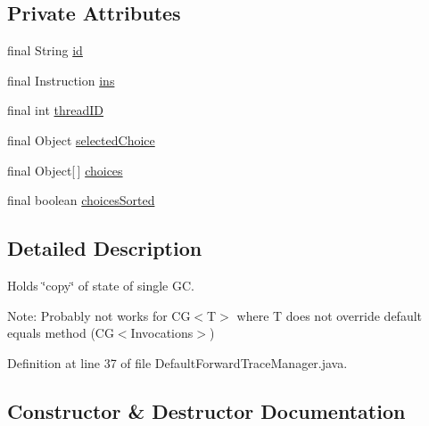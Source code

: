 \subsection*{Private Attributes}
\begin{DoxyCompactItemize}
\item 
final String \hyperlink{classgov_1_1nasa_1_1jpf_1_1inspector_1_1server_1_1breakpoints_1_1_default_forward_trace_manager_1_1_c_g_state_memento_a647b61390c0a8805961939e1ed75a6e1}{id}
\item 
final Instruction \hyperlink{classgov_1_1nasa_1_1jpf_1_1inspector_1_1server_1_1breakpoints_1_1_default_forward_trace_manager_1_1_c_g_state_memento_a84673ec3abdd6b60e5636108fe6090ba}{ins}
\item 
final int \hyperlink{classgov_1_1nasa_1_1jpf_1_1inspector_1_1server_1_1breakpoints_1_1_default_forward_trace_manager_1_1_c_g_state_memento_a0df8f1d8e048a64e584737e11d506eb3}{thread\+ID}
\item 
final Object \hyperlink{classgov_1_1nasa_1_1jpf_1_1inspector_1_1server_1_1breakpoints_1_1_default_forward_trace_manager_1_1_c_g_state_memento_ab02f1d7ec6e3c3ae21ce64e66f2d4001}{selected\+Choice}
\item 
final Object\mbox{[}$\,$\mbox{]} \hyperlink{classgov_1_1nasa_1_1jpf_1_1inspector_1_1server_1_1breakpoints_1_1_default_forward_trace_manager_1_1_c_g_state_memento_abd1aa7e8e5f3401d8cdf5f5824d8a59d}{choices}
\item 
final boolean \hyperlink{classgov_1_1nasa_1_1jpf_1_1inspector_1_1server_1_1breakpoints_1_1_default_forward_trace_manager_1_1_c_g_state_memento_a1f0b1592390489421947f45ca6d9785b}{choices\+Sorted}
\end{DoxyCompactItemize}


\subsection{Detailed Description}
Holds \char`\"{}copy\char`\"{} of state of single GC. 

Note\+: Probably not works for C\+G$<$\+T$>$ where T does not override default equals method (C\+G$<$\+Invocations$>$) 

Definition at line 37 of file Default\+Forward\+Trace\+Manager.\+java.



\subsection{Constructor \& Destructor Documentation}
